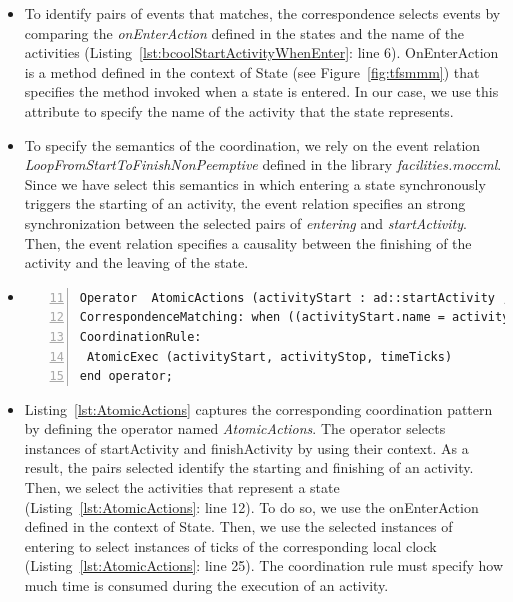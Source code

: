 \begin{itemize}
		 \item To identify pairs of events that matches, the correspondence selects events by comparing the \emph{onEnterAction} defined in the states and the name of the activities (Listing~\ref{lst:bcoolStartActivityWhenEnter}: line 6). OnEnterAction is a method defined in the context of State (see Figure~\ref{fig:tfsmmm}) that specifies the method invoked when a state is entered. In our case, we use this attribute to specify the name of the activity that the state represents. 
		  
		 \item To specify the semantics of the coordination, we rely on the event relation \emph{LoopFromStartToFinishNonPeemptive} defined in the library \emph{facilities.moccml}. Since we have select this semantics in which entering a state synchronously triggers the starting of an activity, the event relation specifies an strong synchronization between the selected pairs of \dse \emph{entering} and \emph{startActivity}. Then, the event relation specifies a causality between the finishing of the activity and the leaving of the state.     

		\item {}
		
\begin{lstlisting}[language=bcool,
caption={Timing coordination operator between TFSM and fUML language},
label={lst:AtomicActions}, 
basicstyle=\scriptsize\ttfamily, backgroundcolor=\color{LGrey}, numbers=left, xleftmargin=2pt, firstnumber=11]
Operator  AtomicActions (activityStart : ad::startActivity , activityStop : ad::finishActivity, enterState : tfsm::entering, leaveState : tfsm::leaving, timeTicks : tfsm::ticks)
CorrespondenceMatching: when ((activityStart.name = activityStop.name ) and (activityStart.name = enterState.OnEnterAction.name ) and (enterState.owningFSM.localClock = timeTicks));
CoordinationRule: 
 AtomicExec (activityStart, activityStop, timeTicks)
end operator;
\end{lstlisting}
		
		\item Listing~\ref{lst:AtomicActions} captures the corresponding coordination pattern by defining the operator named \emph{AtomicActions}. The operator selects instances of \dse startActivity and finishActivity by using their context. As a result, the pairs selected identify the starting and finishing of an activity. Then, we select the activities that represent a state (Listing~\ref{lst:AtomicActions}: line 12). To do so, we use the onEnterAction defined in the context of State. Then, we use the selected instances of \dse entering to select instances of \dse ticks of the corresponding local clock (Listing~\ref{lst:AtomicActions}: line 25). The coordination rule must specify how much time is consumed during the execution of an activity.
		

\end{itemize}
